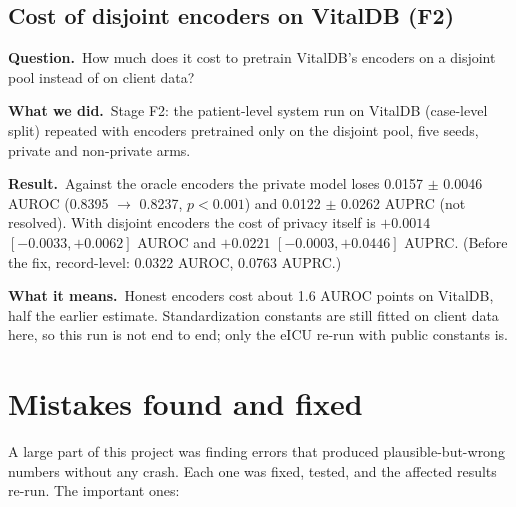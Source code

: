 \documentclass[11pt,a4paper]{article}
\newenvironment{experiment}[2]{\subsection{#1}\label{#2}}{}
\newcommand{\Q}{\par\textbf{Question.}\ }
\newcommand{\D}{\par\textbf{What we did.}\ }
\newcommand{\R}{\par\textbf{Result.}\ }
\newcommand{\M}{\par\textbf{What it means.}\ }
\begin{document}
\begin{experiment}{Cost of disjoint encoders on VitalDB (F2)}{exp:f2}
\Q How much does it cost to pretrain VitalDB's encoders on a disjoint pool
instead of on client data?
\D Stage F2: the patient-level system run on VitalDB (case-level split)
repeated with encoders pretrained only on the disjoint pool, five seeds,
private and non-private arms.
\R Against the oracle encoders the private model loses 0.0157 $\pm$ 0.0046
AUROC (0.8395 $\to$ 0.8237, $p < 0.001$) and 0.0122 $\pm$ 0.0262 AUPRC (not
resolved). With disjoint encoders the cost of privacy itself is $+0.0014$
$[-0.0033, +0.0062]$ AUROC and $+0.0221$ $[-0.0003, +0.0446]$ AUPRC.
(Before the fix, record-level: 0.0322 AUROC, 0.0763 AUPRC.)
\M Honest encoders cost about 1.6 AUROC points on VitalDB, half the earlier
estimate. Standardization constants are still fitted on client data here, so
this run is not end to end; only the eICU re-run with public constants is.
\end{experiment}

\section{Mistakes found and fixed}\label{sec:fix}

A large part of this project was finding errors that produced
plausible-but-wrong numbers without any crash. Each one was fixed, tested,
and the affected results re-run. The important ones:
\end{document}
